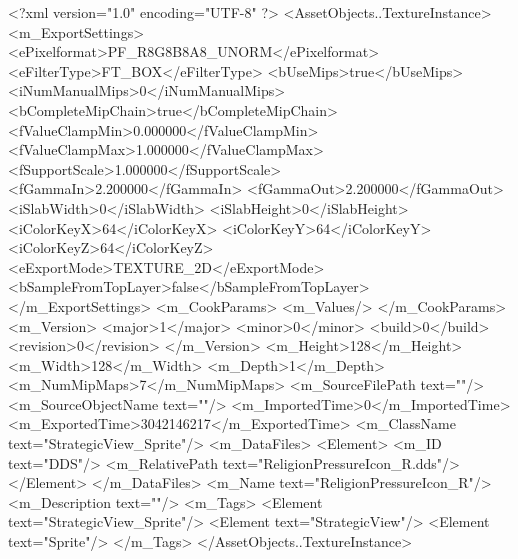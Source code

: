 <?xml version="1.0" encoding="UTF-8" ?>
<AssetObjects..TextureInstance>
	<m_ExportSettings>
		<ePixelformat>PF_R8G8B8A8_UNORM</ePixelformat>
		<eFilterType>FT_BOX</eFilterType>
		<bUseMips>true</bUseMips>
		<iNumManualMips>0</iNumManualMips>
		<bCompleteMipChain>true</bCompleteMipChain>
		<fValueClampMin>0.000000</fValueClampMin>
		<fValueClampMax>1.000000</fValueClampMax>
		<fSupportScale>1.000000</fSupportScale>
		<fGammaIn>2.200000</fGammaIn>
		<fGammaOut>2.200000</fGammaOut>
		<iSlabWidth>0</iSlabWidth>
		<iSlabHeight>0</iSlabHeight>
		<iColorKeyX>64</iColorKeyX>
		<iColorKeyY>64</iColorKeyY>
		<iColorKeyZ>64</iColorKeyZ>
		<eExportMode>TEXTURE_2D</eExportMode>
		<bSampleFromTopLayer>false</bSampleFromTopLayer>
	</m_ExportSettings>
	<m_CookParams>
		<m_Values/>
	</m_CookParams>
	<m_Version>
		<major>1</major>
		<minor>0</minor>
		<build>0</build>
		<revision>0</revision>
	</m_Version>
	<m_Height>128</m_Height>
	<m_Width>128</m_Width>
	<m_Depth>1</m_Depth>
	<m_NumMipMaps>7</m_NumMipMaps>
	<m_SourceFilePath text=""/>
	<m_SourceObjectName text=""/>
	<m_ImportedTime>0</m_ImportedTime>
	<m_ExportedTime>3042146217</m_ExportedTime>
	<m_ClassName text="StrategicView_Sprite"/>
	<m_DataFiles>
		<Element>
			<m_ID text="DDS"/>
			<m_RelativePath text="ReligionPressureIcon_{R}.dds"/>
		</Element>
	</m_DataFiles>
	<m_Name text="ReligionPressureIcon_{R}"/>
	<m_Description text=""/>
	<m_Tags>
		<Element text="StrategicView_Sprite"/>
		<Element text="StrategicView"/>
		<Element text="Sprite"/>
	</m_Tags>
</AssetObjects..TextureInstance>

